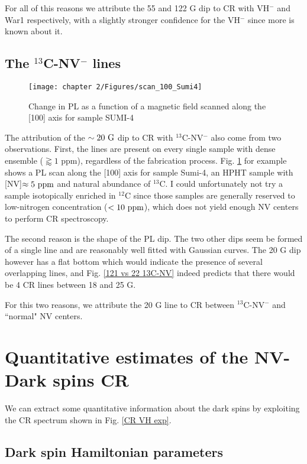 \documentclass[a4paper,11pt]{report}
\begin{document}
\begin{refsection}
For all of this reasons we attribute the 55 and 122 G dip to CR with VH$^-$ and War1 respectively, with a slightly stronger confidence for the VH$^-$ since more is known about it.

\subsection{The $^{13}$C-NV$^-$ lines}

\begin{figure}[h]
\centering
\texttt{[image: chapter 2/Figures/scan\_100\_Sumi4]}
\caption{Change in PL as a function of a magnetic field scanned along the [100] axis for sample SUMI-4}
\label{scan sumi 4}
\end{figure}

The attribution of the $\sim 20\ \rm G$ dip to CR with $^{13}$C-NV$^-$ also come from two observations. First, the lines are present on every single sample with dense ensemble ($\gtrapprox 1$ ppm), regardless of the fabrication process. Fig. \ref{scan sumi 4} for example shows a PL scan along the [100] axis for sample Sumi-4, an HPHT sample with [NV]$\approx 5\ \rm ppm$ and natural abundance of $^{13}$C. I could unfortunately not try a sample isotopically enriched in $^{12}$C since those samples are generally reserved to low-nitrogen concentration ($< 10\ \rm ppm$), which does not yield enough NV centers to perform CR spectroscopy. 

The second reason is the shape of the PL dip. The two other dips seem be formed of a single line and are reasonably well fitted with Gaussian curves. The 20 G dip however has a flat bottom which would indicate the presence of several overlapping lines, and Fig. \ref{121 vs 22 13C-NV} indeed predicts that there would be 4 CR lines between 18 and 25 G.

For this two reasons, we attribute the 20 G line to CR between $^{13}$C-NV$^-$ and ``normal" NV centers.

\section{Quantitative estimates of the NV-Dark spins CR}

We can extract some quantitative information about the dark spins by exploiting the CR spectrum shown in Fig. \ref{CR VH exp}.

\subsection{Dark spin Hamiltonian parameters}


\end{refsection}
\end{document}
